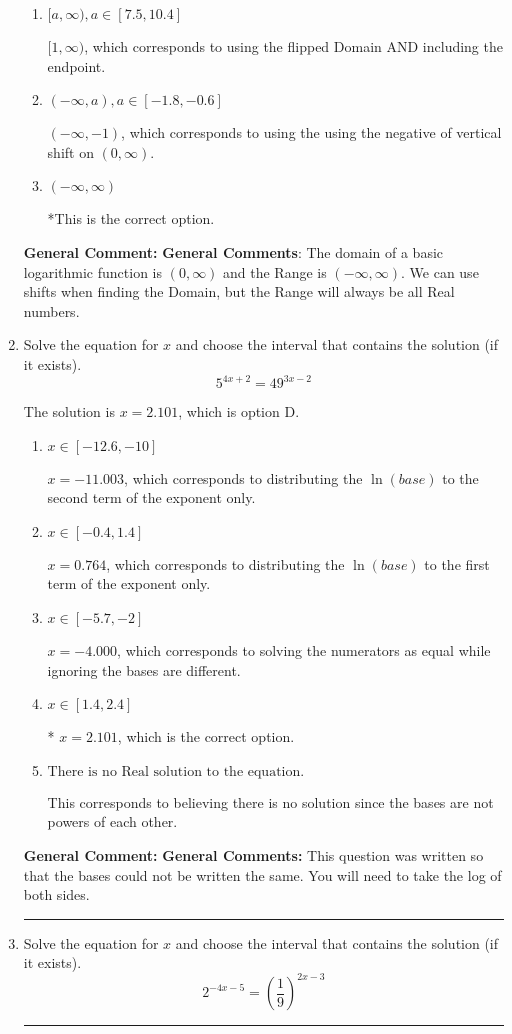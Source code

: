 \documentclass{extbook}[14pt]
\newcommand{\litem}[1]{\item #1

\rule{\textwidth}{0.4pt}}
\begin{document}
\begin{enumerate}
{\begin{enumerate}[label=\Alph*.]
$[-9, \infty)$, which corresponds to using the negative of the horizontal shift AND including the endpoint.
\item \( [a, \infty), a \in [7.5, 10.4] \)

$[1, \infty)$, which corresponds to using the flipped Domain AND including the endpoint.
\item \( (-\infty, a), a \in [-1.8, -0.6] \)

$(-\infty, -1)$, which corresponds to using the using the negative of vertical shift on $(0, \infty)$.
\item \( (-\infty, \infty) \)

*This is the correct option.
\end{enumerate}

\textbf{General Comment:} \textbf{General Comments}: The domain of a basic logarithmic function is $(0, \infty)$ and the Range is $(-\infty, \infty)$. We can use shifts when finding the Domain, but the Range will always be all Real numbers.
}
\litem{
Solve the equation for $x$ and choose the interval that contains the solution (if it exists).
\[ 5^{4x+2} = 49^{3x-2} \]

The solution is \( x = 2.101 \), which is option D.\begin{enumerate}[label=\Alph*.]
\item \( x \in [-12.6, -10] \)

$x = -11.003$, which corresponds to distributing the $\ln(base)$ to the second term of the exponent only.
\item \( x \in [-0.4, 1.4] \)

$x = 0.764$, which corresponds to distributing the $\ln(base)$ to the first term of the exponent only.
\item \( x \in [-5.7, -2] \)

$x = -4.000$, which corresponds to solving the numerators as equal while ignoring the bases are different.
\item \( x \in [1.4, 2.4] \)

* $x = 2.101$, which is the correct option.
\item \( \text{There is no Real solution to the equation.} \)

This corresponds to believing there is no solution since the bases are not powers of each other.
\end{enumerate}

\textbf{General Comment:} \textbf{General Comments:} This question was written so that the bases could not be written the same. You will need to take the log of both sides.
}
\litem{
Solve the equation for $x$ and choose the interval that contains the solution (if it exists).
\[ 2^{-4x-5} = \left(\frac{1}{9}\right)^{2x-3} \]

}
\end{enumerate}
\end{document}
